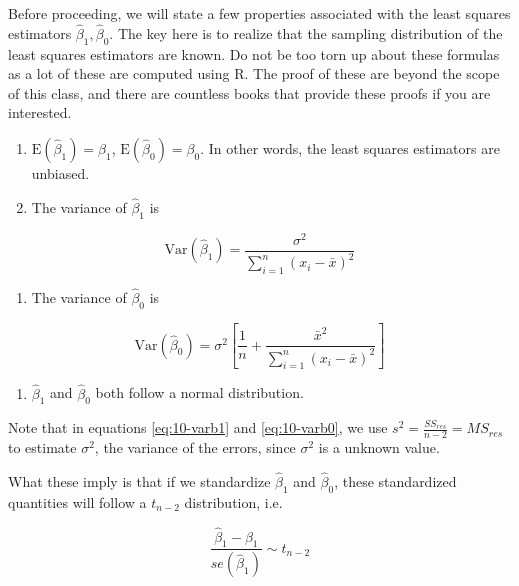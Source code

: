 \documentclass[
]{book}
\providecommand{\tightlist}{%
  \setlength{\itemsep}{0pt}\setlength{\parskip}{0pt}}
\begin{document}
Before proceeding, we will state a few properties associated with the least squares estimators \(\hat{\beta}_1, \hat{\beta}_0\). The key here is to realize that the sampling distribution of the least squares estimators are known. Do not be too torn up about these formulas as a lot of these are computed using R. The proof of these are beyond the scope of this class, and there are countless books that provide these proofs if you are interested.

\begin{enumerate}
\def\labelenumi{\arabic{enumi}.}
\item
  \(\mbox{E}(\hat{\beta}_1) = \beta_1\), \(\mbox{E}(\hat{\beta}_0) = \beta_0\). In other words, the least squares estimators are unbiased.
\item
  The variance of \(\hat{\beta}_1\) is
\end{enumerate}

\begin{equation} 
\mbox{Var}(\hat{\beta}_1) = \frac{\sigma^{2}}{\sum_{i=1}^n{(x_{i}-\bar{x})^{2}}}
\label{eq:10-varb1}
\end{equation}

\begin{enumerate}
\def\labelenumi{\arabic{enumi}.}
\setcounter{enumi}{2}
\tightlist
\item
  The variance of \(\hat{\beta}_0\) is
\end{enumerate}

\begin{equation} 
\mbox{Var}(\hat{\beta}_0) = \sigma^2 \left[\frac{1}{n} + \frac{\bar{x}^2}{\sum_{i=1}^n (x_i -\bar{x})^2}\right]
\label{eq:10-varb0}
\end{equation}

\begin{enumerate}
\def\labelenumi{\arabic{enumi}.}
\setcounter{enumi}{3}
\tightlist
\item
  \(\hat{\beta}_1\) and \(\hat{\beta}_0\) both follow a normal distribution.
\end{enumerate}

Note that in equations \eqref{eq:10-varb1} and \eqref{eq:10-varb0}, we use \(s^2 = \frac{SS_{res}}{n-2} = MS_{res}\) to estimate \(\sigma^2\), the variance of the errors, since \(\sigma^2\) is a unknown value.

What these imply is that if we standardize \(\hat{\beta}_1\) and \(\hat{\beta}_0\), these standardized quantities will follow a \(t_{n-2}\) distribution, i.e.

\begin{equation} 
\frac{\hat{\beta}_1 - \beta_1}{se(\hat{\beta}_1)}\sim t_{n-2}
\label{eq:10-distb1}
\end{equation}
\end{document}
